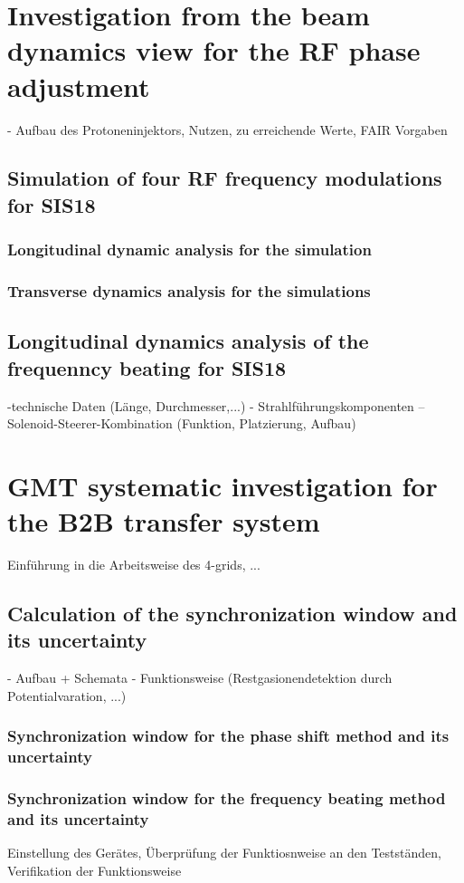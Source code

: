 \section{Investigation from the beam dynamics view for the RF phase adjustment}
- Aufbau des Protoneninjektors, Nutzen, zu erreichende Werte, FAIR Vorgaben
\subsection{Simulation of four RF frequency modulations for SIS18}
\subsubsection{Longitudinal dynamic analysis for the simulation}
\subsubsection{Transverse dynamics analysis for the simulations}
\subsection{Longitudinal dynamics analysis of the frequenncy beating for SIS18}
-technische Daten (Länge, Durchmesser,...)
- Strahlführungskomponenten
--Solenoid-Steerer-Kombination (Funktion, Platzierung, Aufbau)

\section{GMT systematic investigation for the B2B transfer system}
Einführung in die Arbeitsweise des 4-grids, ...
\subsection{Calculation of the synchronization window and its uncertainty}
- Aufbau + Schemata
- Funktionsweise (Restgasionendetektion durch Potentialvaration, ...)
\subsubsection{Synchronization window for the phase shift method and its uncertainty}
\subsubsection{ Synchronization window for the frequency beating method and its uncertainty}
Einstellung des Gerätes, Überprüfung der Funktiosnweise an den Testständen, Verifikation der Funktionsweise
